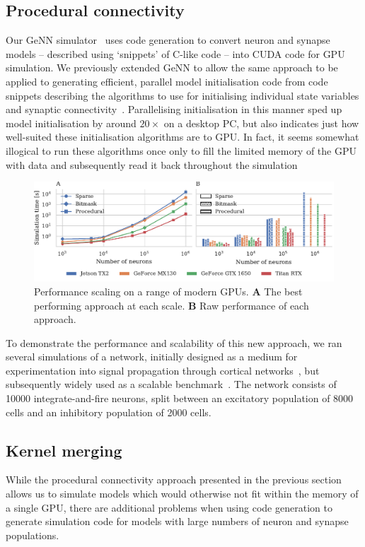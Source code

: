 \documentclass[9pt,twocolumn,twoside,lineno]{pnas-new}
\begin{document}
\subsection*{Procedural connectivity}
Our GeNN simulator~\citep{Yavuz2016} uses code generation to convert neuron and synapse models -- described using `snippets' of C-like code -- into CUDA code for GPU simulation.
We previously extended GeNN to allow the same approach to be applied to generating efficient, parallel model initialisation code from code snippets describing the algorithms to use for initialising individual state variables and synaptic connectivity~\citep{Knight2018}.
Parallelising initialisation in this manner sped up model initialisation by around $20\times$ on a desktop PC, but also indicates just how well-suited these initialisation algorithms are to GPU.
In fact, it seems somewhat illogical to run these algorithms once only to fill the limited memory of the GPU with data and subsequently read it back throughout the simulation 

\begin{figure}
     \centering
    \includegraphics{figures/performance_scaling}
    \caption{Performance scaling on a range of modern GPUs. \textbf{A} The best performing approach at each scale.
    \textbf{B} Raw performance of each approach.}
    \label{fig:performance_scaling}
\end{figure}

To demonstrate the performance and scalability of this new approach, we ran several simulations of a network, initially designed as a medium for experimentation into signal propagation through cortical networks~\citep{Vogels2005}, but subsequently  widely used as a scalable benchmark~\citep{Brette2007}.
The network consists of \num{10000} integrate-and-fire neurons, split between an excitatory population of \num{8000} cells and an inhibitory population of \num{2000} cells.



\subsection*{Kernel merging}
While the procedural connectivity approach presented in the previous section allows us to simulate models which would otherwise not fit within the memory of a single GPU, there are additional problems when using code generation to generate simulation code for models with large numbers of neuron and synapse populations.
\end{document}
